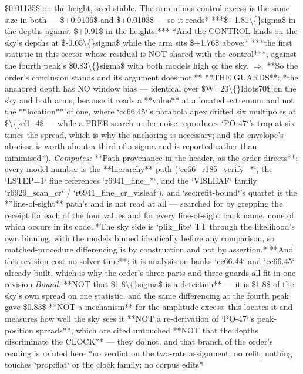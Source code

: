 \begin{description}
\$0.01135\$ on the height, seed-stable. The arm-minus-control excess is the same size in both --- \$+0.0106\$ and \$+0.0103\$ --- so it reads* ***\$+1.81\textbackslash\{\}sigma\$ in the depths against \$+0.91\$ in the heights.*** *And the CONTROL lands on the sky's depths at \$-0.05\textbackslash\{\}sigma\$ while the arm sits \$+1.76\$ above:* ***the first statistic in this sector whose residual is NOT shared with the control***, against the fourth peak's \$0.83\textbackslash\{\}sigma\$ with both models high of the sky. \ensuremath{\Rightarrow} **So the order's conclusion stands and its argument does not.**  **THE GUARDS**: *the anchored depth has NO window bias --- identical over \$W=20\textbackslash\{\}ldots70\$ on the sky and both arms, because it reads a **value** at a located extremum and not the **location** of one, where `cc66.45`'s parabola apex drifted six multipoles at \$\textbackslash\{\}ell\_4\$ --- while a FREE search under noise reproduces `PO-47`'s trap at six times the spread, which is why the anchoring is necessary; and the envelope's abscissa is worth about a third of a sigma and is reported rather than minimised*). 
\emph{Computes:}  **Path provenance in the header, as the order directs**: every model number is the **hierarchy** path (`cc66\_r185\_verify\_*`, the `LSTEP=1` fine references `r6941\_fine\_*`, and the `VISLEAF` family `r6929\_scan\_cr` / `r6941\_fine\_cr\_visleaf`), and `sec:refit-bound`'s quartet is the **line-of-sight** path's and is not read at all --- searched for by grepping the receipt for each of the four values and for every line-of-sight bank name, none of which occurs in its code. *The sky side is `plik\_lite` TT through the likelihood's own binning, with the models binned identically before any comparison, so matched-procedure differencing is by construction and not by assertion.*  **And this revision cost no solver time**: it is analysis on banks `cc66.44` and `cc66.45` already built, which is why the order's three parts and three guards all fit in one revision
 \emph{Bound:}  **NOT that \$1.8\textbackslash\{\}sigma\$ is a detection** --- it is \$1.8\$ of the sky's own spread on one statistic, and the same differencing at the fourth peak gave \$0.83\$  **NOT a mechanism** for the amplitude excess: this locates it and measures how well the sky sees it  **NOT a re-derivation of `PO-47`'s peak-position spreads**, which are cited untouched  **NOT that the depths discriminate the CLOCK** --- they do not, and that branch of the order's reading is refuted here  *no verdict on the two-rate assignment; no refit; nothing touches `prop:flat` or the clock family; no corpus edits*

\end{description}
